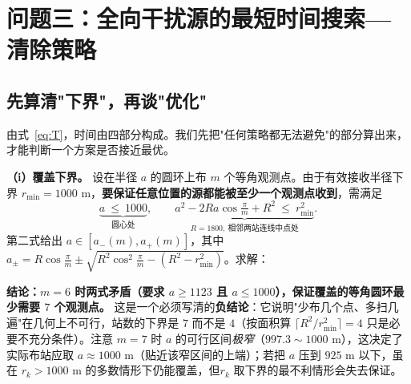 \section{问题三：全向干扰源的最短时间搜索—清除策略}
\label{sec:q3}

\subsection{先算清"下界"，再谈"优化"}

由式~\eqref{eq:T}，时间由四部分构成。我们先把"任何策略都无法避免"的部分算出来，才能判断一个方案是否接近最优。

\noindent\textbf{（i）覆盖下界。} 设在半径 $a$ 的圆环上布 $m$ 个等角观测点。由于有效接收半径下界 $r_{\min}=1000$ m，\textbf{要保证任意位置的源都能被至少一个观测点收到}，需满足
\begin{equation}
\underbrace{a\ \le\ 1000}_{\text{圆心处}},\qquad
\underbrace{a^2-2Ra\cos\tfrac{\pi}{m}+R^2\ \le\ r_{\min}^2}_{R=1800,\ \text{相邻两站连线中点处}} .
\label{eq:cover}
\end{equation}
第二式给出 $a\in[a_-(m),a_+(m)]$，其中 $a_\pm=R\cos\frac{\pi}{m}\pm\sqrt{R^2\cos^2\frac{\pi}{m}-(R^2-r_{\min}^2)}$。求解：

\begin{table}[H]
\centering
\caption{保证覆盖所需的最小站数（$r_{\min}=1000$ m，$R=1800$ m）。环周长与巡回路程由 \texttt{q3\_bounds.py} 复算}
\label{tab:cover}
\small
\setlength{\tabcolsep}{3.4pt}
\end{table}

\textbf{结论：$m=6$ 时两式矛盾（要求 $a\ge1123$ 且 $a\le1000$），保证覆盖的等角圆环最少需要 $7$ 个观测点。} 这是一个必须写清的\textbf{负结论}：它说明"少布几个点、多扫几遍"在几何上不可行，站数的下界是 $7$ 而不是 $4$（按面积算 $\lceil R^2/r_{\min}^2\rceil=4$ 只是必要不充分条件）。注意 $m=7$ 时 $a$ 的可行区间\emph{极窄}（$997.3\!\sim\!1000$ m），这决定了实际布站应取 $a\approx1000$ m（贴近该窄区间的上端）；若把 $a$ 压到 $925$ m 以下，虽在 $r_k>1000$ m 的多数情形下仍能覆盖，但$r_k$ 取下界的最不利情形会失去保证。


